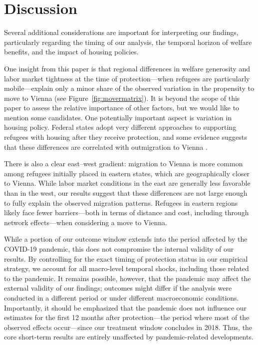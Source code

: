 \FloatBarrier
\section{\label{sec:discussion}Discussion}

Several additional considerations are important for interpreting our findings, particularly regarding the timing of our analysis, the temporal horizon of welfare benefits, and the impact of housing policies.

One insight from this paper is that regional differences in welfare generosity and labor market tightness at the time of protection—when refugees are particularly mobile—explain only a minor share of the observed variation in the propensity to move to Vienna (see Figure~\ref{fig:movermatrix}). It is beyond the scope of this paper to assess the relative importance of other factors, but we would like to mention some candidates. One potentially important aspect is variation in housing policy. Federal states adopt very different approaches to supporting refugees with housing after they receive protection, and some evidence suggests that these differences are correlated with outmigration to Vienna \citep{Dellinger2021Housing}.

There is also a clear east–west gradient: migration to Vienna is more common among refugees initially placed in eastern states, which are geographically closer to Vienna. While labor market conditions in the east are generally less favorable than in the west, our results suggest that these differences are not large enough to fully explain the observed migration patterns. Refugees in eastern regions likely face fewer barriers—both in terms of distance and cost, including through network effects—when considering a move to Vienna.

While a portion of our outcome window extends into the period affected by the COVID-19 pandemic, this does not compromise the internal validity of our results. By controlling for the exact timing of protection status in our empirical strategy, we account for all macro-level temporal shocks, including those related to the pandemic. It remains possible, however, that the pandemic may affect the external validity of our findings; outcomes might differ if the analysis were conducted in a different period or under different macroeconomic conditions. Importantly, it should be emphasized that the pandemic does not influence our estimates for the first 12 months after protection—the period where most of the observed effects occur—since our treatment window concludes in 2018. Thus, the core short-term results are entirely unaffected by pandemic-related developments.

